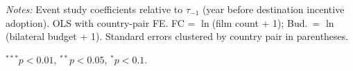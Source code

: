 \begin{table}[htbp]
\begin{tabular}{l cc cc cc }
\bottomrule
\end{tabular}
\par\vspace{4pt}\noindent\begin{minipage}{\textwidth}
\footnotesize
\par \textit{Notes:} Event study coefficients relative to $\tau_{-1}$ (year before destination incentive adoption). OLS with country-pair FE. FC = $\ln$(film count + 1); Bud.\ = $\ln$(bilateral budget + 1). Standard errors clustered by country pair in parentheses.
\par $^{***}p<0.01$, $^{**}p<0.05$, $^{*}p<0.1$.
\end{minipage}
\end{table}

\clearpage


